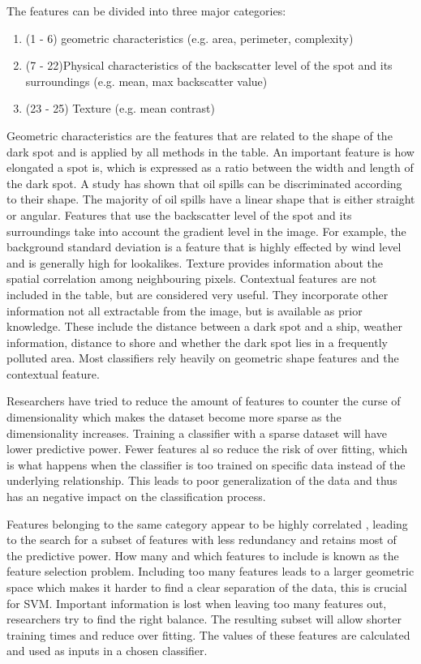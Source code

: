 The features can be divided into three major categories\cite{Brekke200595}:
\begin{enumerate}
\item (1 - 6) geometric characteristics (e.g. area, perimeter, complexity)
\item (7 - 22)Physical characteristics of the backscatter level of the spot and its surroundings (e.g. mean, max backscatter value)
\item (23 - 25) Texture (e.g. mean contrast)
\end{enumerate}

Geometric characteristics are the features that are related to the shape of the dark spot and is applied by all methods in the table\cite{Topouzelis200930}. An important feature is how elongated a spot is, which is expressed as a ratio between the width and length of the dark spot\cite{Gasull20071}. A study has shown that oil spills can be discriminated according to their shape\cite{Guo2014146}. The majority of oil spills have a linear shape that is either straight or angular\cite{Pavlakis200156}. Features that use the backscatter level of the spot and its surroundings take into account the gradient level in the image. For example, the background standard deviation is a feature that is highly effected by wind level and is generally high for lookalikes. Texture provides information about the spatial correlation among neighbouring pixels. Contextual features are not included in the table, but are considered very useful\cite{Topouzelis200930}. They incorporate other information not all extractable from the image, but is available as prior knowledge. These include the distance between a dark spot and a ship, weather information, distance to shore and whether the dark spot lies in a frequently polluted area. Most classifiers rely heavily on geometric shape features and the contextual feature.\cite{Xu201414}

Researchers have tried to reduce the amount of features to counter the curse of dimensionality which makes the dataset become more sparse as the dimensionality increases. Training a classifier with a sparse dataset will have lower predictive power. Fewer features al so reduce the risk of over fitting, which is what happens when the classifier is too trained on specific data instead of the underlying relationship. This leads to poor generalization of the data and thus has an negative impact on the classification process.

Features belonging to the same category appear to be highly correlated \cite{Xu201414}, leading to the search for a subset of features with less redundancy and retains most of the predictive power. How many and which features to include is known as the feature selection problem. Including too many features leads to a larger geometric space which makes it harder to find a clear separation of the data, this is crucial for SVM. Important information is lost when leaving too many features out, researchers try to find the right balance. The resulting subset will allow shorter training times and reduce over fitting. The values of these features are calculated and used as inputs in a chosen classifier.
